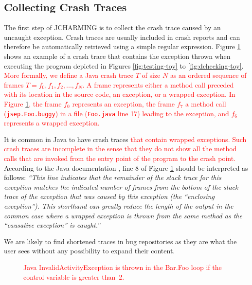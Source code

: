 \documentclass[times, doublespace]{smrauth}
\newcommand{\red}[1]{\textcolor{red}{#1}}
\begin{document}
\subsection{Collecting Crash Traces}

The first step of JCHARMING is to collect the crash trace
caused by an uncaught exception. Crash traces are usually included in crash reports and can therefore be automatically
retrieved using a simple regular expression.
Figure \ref{fig:jcarming-traces} shows an example of a crash trace that contains the
exception thrown when executing the program depicted in
Figures \ref{fig:testing-toy} to \ref{fig:dchecking-toy}.
\red{More formally, we define a Java crash trace $T$ of size $N$ as an ordered sequence of frames $T={f_0, f_1, f_2, ..., f_N}$. A frame represents either a method call preceded with its location in the source code, an exception, or a wrapped exception.
In Figure \ref{fig:jcarming-traces}, the frame $f_0$ represents an exception, the frame  $f_7$ a method call (\texttt{jsep.Foo.buggy}) in a file (\texttt{Foo.java} line 17) leading to the exception, and $f_6$ represents a wrapped exception.}

It is common in Java to have crash
traces \red{that contain wrapped exceptions.
Such crash traces are incomplete in the sense that they do not show all the method calls that are invoked from the entry point of the program to the crash point.}
According to the Java documentation \cite{Oracle2011}, line 8 of
Figure \ref{fig:jcarming-traces} should be interpreted as follows: {\it ``This line indicates
that the remainder of the stack trace for this exception
matches the indicated number of frames from the bottom of the
stack trace of the exception that was caused by this exception
(the ``enclosing exception''). This shorthand can greatly
reduce the length of the output in the common case where a
wrapped exception is thrown from the same method as the
``causative exception'' is caught.}''

We are likely to find shortened traces in bug repositories as
they are what the user sees without any possibility to expand
their content.


\begin{figure}
  \noindent{}
    \caption{\red{Java InvalidActivityException is thrown in the Bar.Foo loop if the control variable is greater than~2.}
    \label{fig:jcarming-traces}}
\end{figure}
\end{document}
